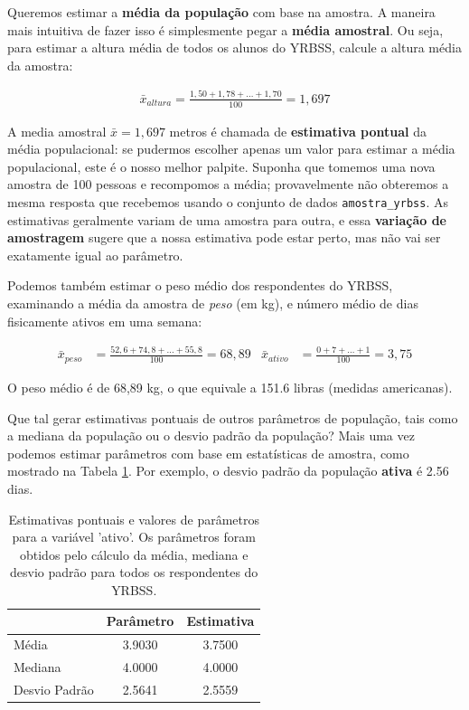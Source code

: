\documentclass[
]{book}
\theoremstyle{definition}
\theoremstyle{definition}
\theoremstyle{definition}
\theoremstyle{definition}
\theoremstyle{remark}
\begin{document}
Queremos estimar a \textbf{média da população} com base na amostra. A maneira mais intuitiva de fazer isso é simplesmente pegar a \textbf{média amostral}. Ou seja, para estimar a altura média de todos os alunos do YRBSS, calcule a altura média da amostra:

\begin{eqnarray*}
\bar{x}_{altura} = \frac{1,50 + 1,78 + \dots + 1,70}{100} = 1,697
\end{eqnarray*}

A media amostral \(\bar{x} = 1,697\) metros é chamada de \textbf{estimativa pontual} da média populacional: se pudermos escolher apenas um valor para estimar a média populacional, este é o nosso melhor palpite. Suponha que tomemos uma nova amostra de 100 pessoas e recompomos a média; provavelmente não obteremos a mesma resposta que recebemos usando o conjunto de dados \texttt{amostra\_yrbss}. As estimativas geralmente variam de uma amostra para outra, e essa \textbf{variação de amostragem} sugere que a nossa estimativa pode estar perto, mas não vai ser exatamente igual ao parâmetro.

Podemos também estimar o peso médio dos respondentes do YRBSS, examinando a média da amostra de \emph{peso} (em kg), e número médio de dias fisicamente ativos em uma semana:

\begin{align*}
\bar{x}_{peso} &= \frac{52,6 + 74,8 + \dots + 55,8}{100} = 68,89
&\bar{x}_{ativo} &= \frac{0 + 7 + \dots + 1}{100} = 3,75
\end{align*}

O peso médio é de 68,89 kg, o que equivale a 151.6 libras (medidas americanas).

Que tal gerar estimativas pontuais de outros parâmetros de população, tais como a mediana da população ou o desvio padrão da população? Mais uma vez podemos estimar parâmetros com base em estatísticas de amostra, como mostrado na Tabela \ref{tab:ptEstimatesYrbssActive}. Por exemplo, o desvio padrão da população \textbf{ativa} é 2.56 dias.

\begin{table}

\caption{\label{tab:ptEstimatesYrbssActive}Estimativas pontuais e valores de parâmetros para a variável 'ativo'. Os parâmetros foram obtidos pelo cálculo da média, mediana e desvio padrão para todos os respondentes do YRBSS.}
\centering
\begin{tabular}[t]{l|c|c}
\hline
  & Parâmetro & Estimativa\\
\hline
Média & 3.9030 & 3.7500\\
\hline
Mediana & 4.0000 & 4.0000\\
\hline
Desvio Padrão & 2.5641 & 2.5559\\
\hline
\end{tabular}
\end{table}
\end{document}
